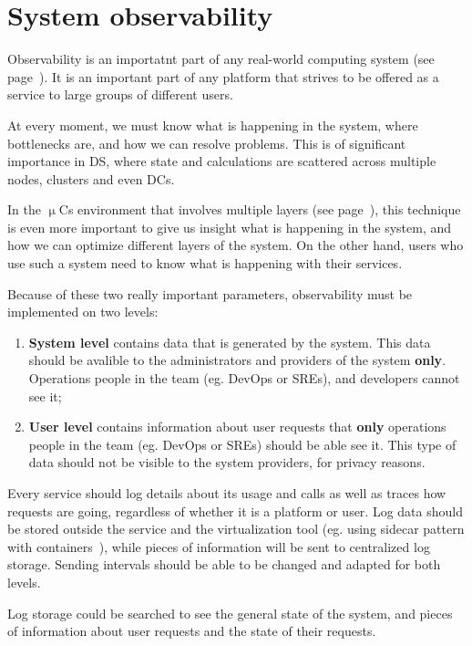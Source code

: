 \section{System observability}\label{sec:system_observability}
%
Observability is an importatnt part of any real-world computing system (see page~\pageref{sec:log_aggregation}). It is an important part of any platform that strives to be offered as a service to large groups of different users. 

At every moment, we must know what is happening in the system, where bottlenecks are, and how we can resolve problems. This is of significant importance in DS, where state and calculations are scattered across multiple nodes, clusters and even DCs.

In the $\upmu$Cs environment that involves multiple layers (see page~\pageref{lab:three-tier}), this technique is even more important to give us insight what is happening in the system, and how we can optimize different layers of the system. On the other hand, users who use such a system need to know what is happening with their services.

Because of these two really important parameters, observability must be implemented on two levels:

\begin{enumerate}[start=1,label={(\bfseries \arabic*)}]
	\item \textbf{System level} contains data that is generated by the system. This data should be avalible to the administrators and providers of the system \textbf{only}. Operations people in the team (eg. DevOps or SREs), and developers cannot see it;
	\item \textbf{User level} contains information about user requests that \textbf{only} operations people in the team (eg. DevOps or SREs) should be able see it. This type of data should not be visible to the system providers, for privacy reasons.
\end{enumerate}

\noindent
Every service should log details about its usage and calls as well as traces how requests are going, regardless of whether it is a platform or user. Log data should be stored outside the service and the virtualization tool (eg. using sidecar pattern with containers~\cite{BurnsO16}), while pieces of information will be sent to centralized log storage. Sending intervals should be able to be changed and adapted for both levels.

Log storage could be searched to see the general state of the system, and pieces of information about user requests and the state of their requests.
%
%
